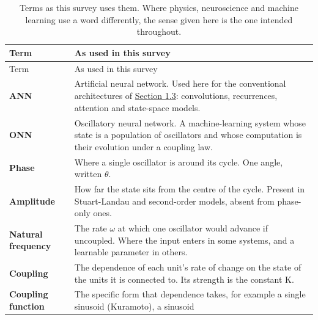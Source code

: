\documentclass[10pt]{article}
\begin{document}
\begin{longtable}[]{@{}
  >{\raggedright\arraybackslash}p{}
  >{\raggedright\arraybackslash}p{}@{}}
\caption{Terms as this survey uses them. Where physics, neuroscience and
machine learning use a word differently, the sense given here is the one
intended throughout.}\tabularnewline
\toprule\noalign{}
\begin{minipage}[b]{\linewidth}\raggedright
Term
\end{minipage} & \begin{minipage}[b]{\linewidth}\raggedright
As used in this survey
\end{minipage} \\
\midrule\noalign{}
\endfirsthead
\toprule\noalign{}
\begin{minipage}[b]{\linewidth}\raggedright
Term
\end{minipage} & \begin{minipage}[b]{\linewidth}\raggedright
As used in this survey
\end{minipage} \\
\midrule\noalign{}
\endhead
\bottomrule\noalign{}
\endlastfoot
\textbf{ANN} & Artificial neural network. Used here for the conventional
architectures of \hyperref[sec-1-3]{Section 1.3}: convolutions,
recurrences, attention and state-space models. \\
\cmidrule{1-2}\textbf{ONN} & Oscillatory neural network. A
machine-learning system whose state is a population of oscillators and
whose computation is their evolution under a coupling law. \\
\cmidrule{1-2}\textbf{Phase} & Where a single oscillator is around its
cycle. One angle, written \ensuremath{\theta}. \\
\cmidrule{1-2}\textbf{Amplitude} & How far the state sits from the
centre of the cycle. Present in Stuart-Landau and second-order models,
absent from phase-only ones. \\
\cmidrule{1-2}\textbf{Natural frequency} & The rate \ensuremath{\omega}
at which one oscillator would advance if uncoupled. Where the input
enters in some systems, and a learnable parameter in others. \\
\cmidrule{1-2}\textbf{Coupling} & The dependence of each unit's rate of
change on the state of the units it is connected to. Its strength is the
constant K. \\
\cmidrule{1-2}\textbf{Coupling function} & The specific form that
dependence takes, for example a single sinusoid (Kuramoto), a sinusoid

\end{longtable}
\end{document}
